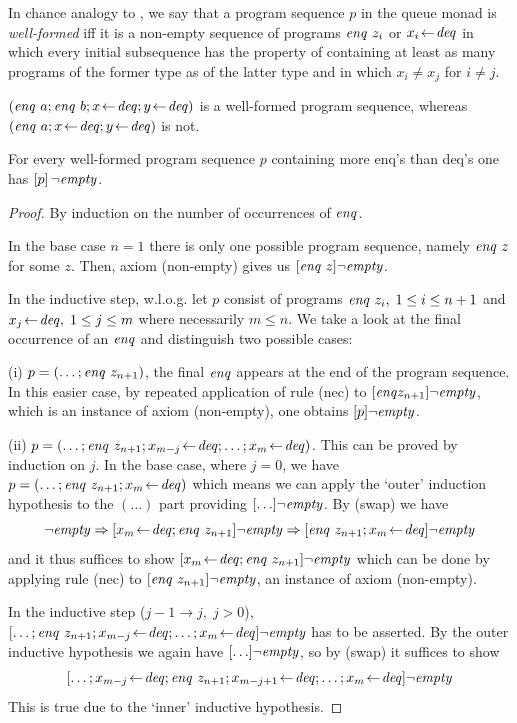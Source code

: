 \begin{defn} In chance analogy to \cite{ClaessenHughes}, we say that a program
  sequence $p$ in the queue monad is \emph{well-formed} iff it is a non-empty
  sequence of programs $\mathit{enq}~z_i$ or $x_i\!\gets\! \mathit{deq}$ in which every initial
  subsequence has the property of containing at least as many programs of the
  former type as of the latter type and in which $x_i \neq x_j$ for $i \neq j$.
\end{defn}

\begin{expl}
$(\mathit{enq}~a; \mathit{enq}~b; x \!\gets\! \mathit{deq}; y \!\gets\! \mathit{deq})$ is a well-formed program
  sequence, whereas $(\mathit{enq}~a; x\!\gets\! \mathit{deq}; y\!\gets\! \mathit{deq})$ is not.
\end{expl}

\begin{thm}
\label{wf-empty}
 For every well-formed program sequence $p$ containing more enq's
than deq's one has $[p]\,\lnot \mathit{empty}$.
\end{thm}

\begin{proof} By induction on the number of occurrences of $\mathit{enq}$.

In the base case $n=1$ there is only one possible program sequence, namely
$\mathit{enq}~z$ for some $z$. Then, axiom (non-empty) gives us $[\mathit{enq}~z]\lnot \mathit{empty}$.

In the inductive step, w.l.o.g. let $p$ consist of programs $\mathit{enq}~z_i,\; 1\leq i\leq
n+1$ and $x_j\!\gets\! \mathit{deq},\;1\leq j\leq m$ where necessarily $m\leq n$. We take a look at the final
occurrence of an $\mathit{enq}$ and distinguish two possible cases:

(i) $p =( \ldots; \mathit{enq}~z_{n+1})$, \IE the final $\mathit{enq}$ appears at the end of the program
sequence. In this easier case, by repeated application of rule (nec) to $[\mathit{enq}
z_{n+1}]\lnot \mathit{empty}$, which is an instance of axiom (non-empty), one obtains $[p]\lnot
\mathit{empty}$.

(ii) $p = (\ldots; \mathit{enq}~z_{n+1}; x_{m-j}\!\gets\! \mathit{deq}; \ldots; x_{m}\!\gets\! \mathit{deq})$. This can be proved by
induction on $j$. In the base case, where $j=0$, we have $p = (\ldots; \mathit{enq}~z_{n+1};
x_{m}\!\gets\! \mathit{deq})$ which means we can apply the `outer' induction hypothesis to the
$(\ldots)$ part providing $[\ldots]\lnot \mathit{empty}$. By (swap) we have 
\[
\lnot \mathit{empty} \Rightarrow [x_m\!\gets\! \mathit{deq}; \mathit{enq}~z_{n+1}]\lnot \mathit{empty} \Rightarrow [\mathit{enq}~z_{n+1}; x_m\!\gets\! \mathit{deq}]\lnot \mathit{empty}
\]
and
it thus suffices to show $[x_m\!\gets\! \mathit{deq}; \mathit{enq}~z_{n+1}]\lnot \mathit{empty}$ which can be done by
applying rule (nec) to $[\mathit{enq}~z_{n+1}]\lnot \mathit{empty}$, an instance of axiom (non-empty).

In the inductive step {\small ($j-1\to j,\;j>0$)},
$[\ldots; \mathit{enq}~z_{n+1}; x_{m-j}\!\gets\! \mathit{deq}; \ldots; x_{m}\!\gets\! \mathit{deq}]\lnot \mathit{empty}$ has to be asserted. By the
outer inductive hypothesis we again have  $[\ldots]\lnot \mathit{empty}$, so by (swap) it suffices
to show 
\[
[\ldots; x_{m-j}\!\gets\! \mathit{deq}; \mathit{enq}~z_{n+1}; x_{m-j+1}\!\gets\! \mathit{deq}; \ldots; x_{m}\!\gets\! \mathit{deq}]\lnot \mathit{empty}
\]
This is true due to the `inner' inductive hypothesis.
\end{proof}

